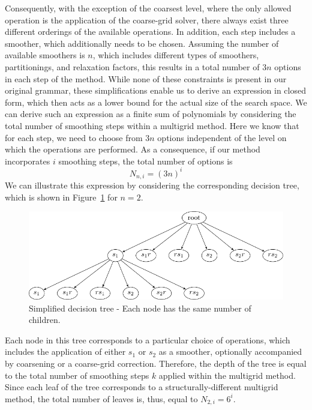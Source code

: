 Consequently, with the exception of the coarsest level, where the only allowed operation is the application of the coarse-grid solver, there always exist three different orderings of the available operations.
In addition, each step includes a smoother, which additionally needs to be chosen.
Assuming the number of available smoothers is $n$, which includes different types of smoothers, partitionings, and relaxation factors, this results in a total number of $3 n$ options in each step of the method.
While none of these constraints is present in our original grammar, these simplifications enable us to derive an expression in closed form, which then acts as a lower bound for the actual size of the search space.
We can derive such an expression as a finite sum of polynomials by considering the total number of smoothing steps within a multigrid method.
Here we know that for each step, we need to choose from $3 n$ options independent of the level on which the operations are performed.
As a consequence, if our method incorporates $i$ smoothing steps, the total number of options is 
\begin{equation}\tag{4.9}
	N_{n,i} = (3 n)^i
	\label{eq:simplified-number-of-options}
\end{equation}
We can illustrate this expression by considering the corresponding decision tree, which is shown in Figure~\ref{fig:decision-tree} for $n = 2$.
\begin{figure}
	\centering
	\includegraphics[width=\textwidth]{figures/trees/decision_tree.pdf}
	\caption{Simplified decision tree - Each node has the same number of children.}
	\label{fig:decision-tree}
\end{figure}
Each node in this tree corresponds to a particular choice of operations, which includes the application of either $s_1$ or $s_2$ as a smoother, optionally accompanied by coarsening or a coarse-grid correction.
Therefore, the depth of the tree is equal to the total number of smoothing steps $k$ applied within the multigrid method.
Since each leaf of the tree corresponds to a structurally-different multigrid method, the total number of leaves is, thus, equal to $N_{2,i} = 6^i$.
